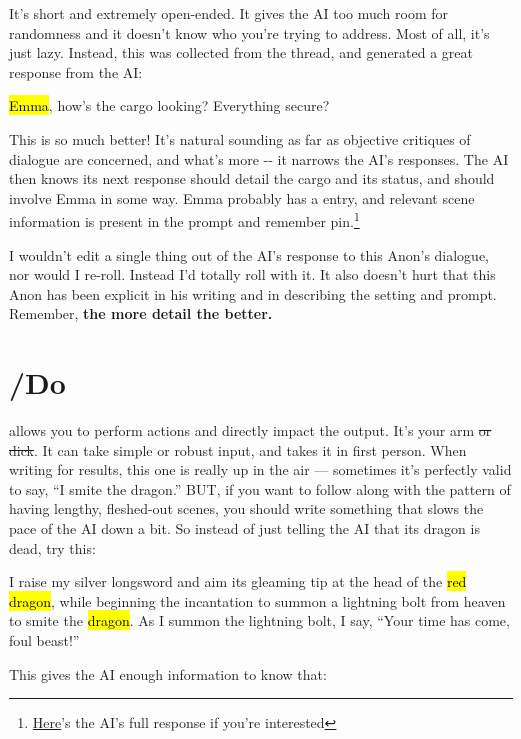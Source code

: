 \documentclass[Avsfag-main.tex]{subfiles}
\begin{document}
It's short and extremely open-ended.
It gives the AI too much room for randomness and it doesn't know who you're trying to address. 
Most of all, it's just lazy.
Instead, this was collected from the thread, and generated a great response from the AI:

\begin{storyb}
	\say \hl{Emma}, how's the cargo looking? Everything secure?
\end{storyb}

This is so much better! It's natural sounding as far as objective
critiques of dialogue are concerned, and what's more -\/- it narrows the
AI's responses. The AI then knows its next response should detail the
cargo and its status, and should involve Emma in some way. Emma probably
has a \wi entry, and relevant scene information is present in the
prompt and remember pin.\footnote{\href{https://imgur.com/a/tDOMioc}{Here}'s the AI's full response if you're interested}

I wouldn't edit a single thing out of the AI's response to this Anon's dialogue, nor would I re-roll.
Instead I'd totally roll with it.
It also doesn't hurt that this Anon has been explicit in his writing and in describing the setting and prompt.
Remember, \textbf{the more detail the better.}

\section{/Do}

\Do allows you to perform actions and directly impact the output.
It's your arm \st{or dick}.
It can take simple or robust input, and takes it in first person.
When writing for results, this one is really up in the air --- sometimes it's perfectly valid to
say, ``I smite the dragon.''
BUT, if you want to follow along with the pattern of having lengthy, fleshed-out scenes, you should write something that slows the pace of the AI down a bit.
So instead of just telling the AI that its dragon is dead, try this:

\begin{storyb}
	\Do I raise my silver longsword and aim its gleaming tip at the head of the \hl{red dragon}, while beginning the incantation to summon a lightning bolt from heaven to smite the \hl{dragon}.
	As I summon the lightning bolt, I say, ``Your time has come, foul beast!''
\end{storyb}

This gives the AI enough information to know that:
\end{document}
